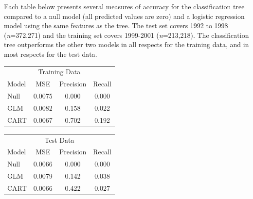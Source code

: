 \documentclass[landscape, paperwidth=42in, paperheight=36in,
fontscale=.35, margin=1in]{baposter}
\begin{document}
\begin{poster}
{\vspace{-1.3in}
  Each table below presents several measures of accuracy for the classification tree compared to a null model (all predicted values are zero) and a logistic regression model using the same features as the tree. The test set covers 1992 to 1998 (\emph{n}=372,271) and the training set covers 1999-2001 (\emph{n}=213,218). The classification tree outperforms the other two models in all respects for the training data, and in most respects for the test data. 

  \begin{center}
  \begin{tabular}{l|ccc}
  \multicolumn{4}{c}{Training Data} \\
  Model & MSE & Precision & Recall \\
  \midrule
  Null & 0.0075 & 0.000 & 0.000 \\
  GLM & 0.0082 & 0.158 & 0.022 \\
  CART & 0.0067 & 0.702 & 0.192 
  \end{tabular}
  \end{center}

  \begin{center}
  \begin{tabular}{l|ccc}
  \multicolumn{4}{c}{Test Data} \\
  Model & MSE & Precision & Recall \\
  \midrule
  Null & 0.0066 & 0.000 & 0.000 \\
  GLM & 0.0079 & 0.142 & 0.038 \\
  CART & 0.0066 & 0.422 & 0.027 
  \end{tabular}
  \end{center}

 }


\end{poster}
\end{document}
